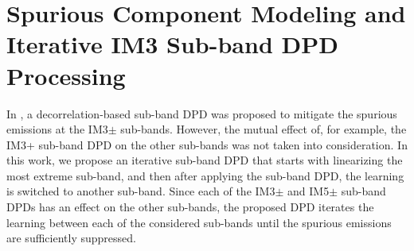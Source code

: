 \section{Spurious Component Modeling and Iterative IM3 Sub-band DPD Processing}
\label{sec:Analysis}
In \cite{ICASSP2014}, a decorrelation-based sub-band DPD was proposed to mitigate the spurious emissions at the IM3$\pm$ sub-bands. 
However, the mutual effect of, for example, the IM3+ sub-band DPD on the other sub-bands was not taken into consideration. 
In this work, we propose an iterative sub-band DPD that starts with linearizing the most extreme sub-band, and then after applying the sub-band DPD, the learning is switched to another sub-band. 
Since each of the IM3$\pm$ and IM5$\pm$ sub-band DPDs has an effect on the other sub-bands, the proposed DPD iterates the learning between each of the considered sub-bands until the spurious emissions are sufficiently suppressed.

